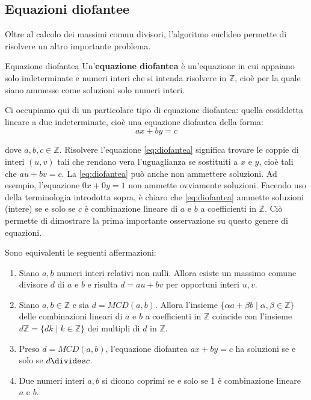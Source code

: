 \subsection{Equazioni diofantee}

Oltre al calcolo dei massimi comun divisori, l’algoritmo euclideo permette di risolvere un altro importante problema.

\begin{defbox}{Equazione diofantea}
	Un’\textbf{equazione diofantea} è un’equazione in cui appaiano solo indeterminate e numeri interi che si intenda risolvere in $\mathbb{Z}$, cioè per la quale siano ammesse come soluzioni solo numeri interi.
\end{defbox} 

Ci occupiamo qui di un particolare tipo di equazione diofantea: quella cosiddetta lineare a due indeterminate, cioè una equazione diofantea della forma:
\begin{equation}\label{eq:diofantea}
	ax+by=c
\end{equation}

dove $a,b,c \in \mathbb{Z}$. Risolvere l'equazione \ref{eq:diofantea} significa trovare le coppie di interi $(u,v)$ tali che rendano vera l'uguaglianza se sostituiti a $x$ e $y$, cioè tali che $au+bv=c$. La \ref{eq:diofantea} può anche non ammettere soluzioni. Ad esempio, l'equazione $0x+0y=1$ non ammette ovviamente soluzioni. Facendo uso della terminologia introdotta sopra, è chiaro che \ref{eq:diofantea} ammette soluzioni (intere) se e solo se $c$ è combinazione lineare di $a$ e $b$ a coefficienti in $\mathbb{Z}$. Ciò permette di dimostrare la prima importante osservazione su questo genere
di equazioni.

\begin{teorbox}[di Bezout]\label{thm:bezout}
	Sono equivalenti le seguenti affermazioni:
	\begin{enumerate}
		\item Siano $a,b$ numeri interi relativi non nulli. Allora esiste un massimo comune divisore $d$ di $a$ e $b$ e risulta $d = au+bv$ per opportuni interi $u,v$.
		\item Siano $a,b \in \mathbb{Z}$ e sia $d = MCD(a,b)$. Allora l'insieme $\{\alpha a + \beta b \; | \; \alpha, \beta \in \mathbb{Z}\}$ delle combinazioni lineari di $a$ e $b$ a coefficienti in $\mathbb{Z}$ coincide con l'insieme $d\mathbb{Z}=\{dk \; | \; k \in \mathbb{Z}\}$ dei multipli di $d$ in $\mathbb{Z}$.
		\item Preso $d= MCD(a,b)$, l'equazione diofantea $ax+by=c$ ha soluzioni se e solo se $d \divides c$.
		\item Due numeri interi $a,b$ si dicono coprimi se e solo se 1 è combinazione lineare $a$ e $b$.
	\end{enumerate}
\end{teorbox}

